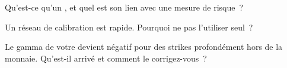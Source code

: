 \begin{interviewq}\label{iq:ml:deep-hedging-and-machine-learning-in-pricing:4}
Qu'est-ce qu'un , et quel est son lien avec une mesure de risque~?
\end{interviewq}

\begin{interviewq}\label{iq:ml:deep-hedging-and-machine-learning-in-pricing:5}
Un réseau de calibration est rapide. Pourquoi ne pas l'utiliser seul~?
\end{interviewq}

\begin{interviewq}\label{iq:ml:deep-hedging-and-machine-learning-in-pricing:6}
Le gamma de votre  devient négatif pour des strikes profondément hors de la monnaie. Qu'est-il arrivé et comment le corrigez-vous~?
\end{interviewq}
